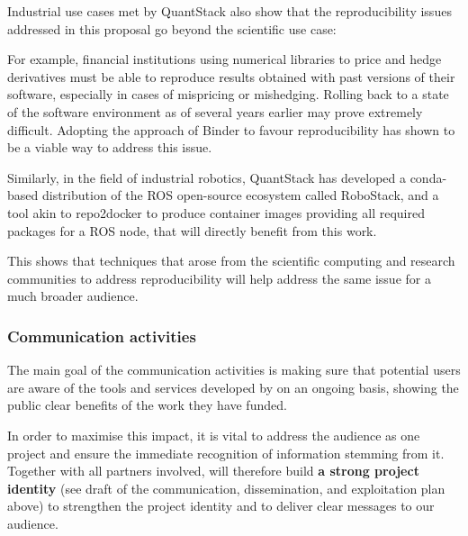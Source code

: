 Industrial use cases met by QuantStack also show that the reproducibility issues addressed in this proposal go
beyond the scientific use case:

\begin{compactitem}
\item For example, financial institutions using numerical libraries to price and hedge derivatives must be able
   to reproduce results obtained with past versions of their software, especially in cases of mispricing or
   mishedging. Rolling back to a state of the software environment as of several years earlier may prove
   extremely difficult. Adopting the approach of Binder to favour reproducibility has shown to be a viable way
   to address this issue.
\item Similarly, in the field of industrial robotics, QuantStack has developed a conda-based distribution of the
   ROS open-source ecosystem called RoboStack, and a tool akin to repo2docker to produce container images providing
   all required packages for a ROS node, that will directly benefit from this work.
\end {compactitem}

This shows that techniques that arose from the scientific computing and research communities to address reproducibility
will help address the same issue for a much broader audience.

\subsubsection{Communication activities}

The main goal of the communication activities is making sure that potential users
are aware of the tools and services developed by \TheProject
on an ongoing basis,
showing the public clear benefits of the work they have funded.

In order to maximise this impact, it is vital to address the audience as one project
and ensure the immediate recognition of information stemming from it.
Together with all partners involved, \TheProject will therefore build \textbf{a strong project identity}
(see draft of the communication, dissemination, and exploitation plan above) to strengthen the project
identity and to deliver clear messages to our audience.

